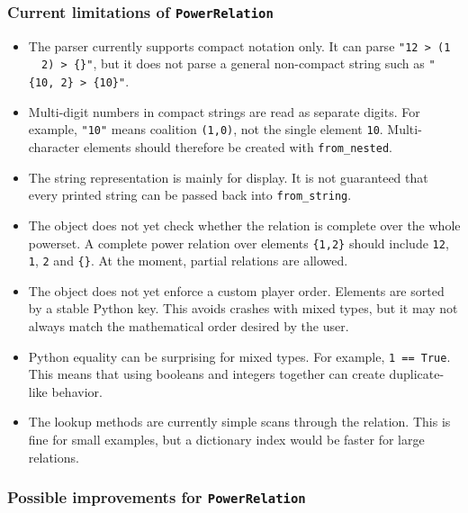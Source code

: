 \documentclass[11pt]{article}
\begin{document}
\subsubsection*{Current limitations of \texttt{PowerRelation}}

\begin{itemize}
  \item The parser currently supports compact notation only. It can parse
  \texttt{"12 > (1 \string~ 2) > \{\}"}, but it does not parse a general
  non-compact string such as \texttt{"\{10, 2\} > \{10\}"}.
  \item Multi-digit numbers in compact strings are read as separate digits.
  For example, \texttt{"10"} means coalition \texttt{(1,0)}, not the single
  element \texttt{10}. Multi-character elements should therefore be created
  with \texttt{from\_nested}.
  \item The string representation is mainly for display. It is not guaranteed
  that every printed string can be passed back into \texttt{from\_string}.
  \item The object does not yet check whether the relation is complete over
  the whole powerset. A complete power relation over elements
  \texttt{\{1,2\}} should include \texttt{12}, \texttt{1}, \texttt{2} and
  \texttt{\{\}}. At the moment, partial relations are allowed.
  \item The object does not yet enforce a custom player order. Elements are
  sorted by a stable Python key. This avoids crashes with mixed types, but it
  may not always match the mathematical order desired by the user.
  \item Python equality can be surprising for mixed types. For example,
  \texttt{1 == True}. This means that using booleans and integers together can
  create duplicate-like behavior.
  \item The lookup methods are currently simple scans through the relation.
  This is fine for small examples, but a dictionary index would be faster for
  large relations.
\end{itemize}

\subsubsection*{Possible improvements for \texttt{PowerRelation}}
\end{document}
